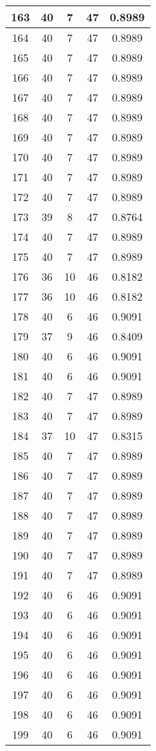 \documentclass[letterpaper, 12pt]{article}
\begin{document}
\begin{longtable}{|c|c|c|c|c|}
\hline
163 & 40 & 7 & 47 & 0.8989 \\
\hline
164 & 40 & 7 & 47 & 0.8989 \\
\hline
165 & 40 & 7 & 47 & 0.8989 \\
\hline
166 & 40 & 7 & 47 & 0.8989 \\
\hline
167 & 40 & 7 & 47 & 0.8989 \\
\hline
168 & 40 & 7 & 47 & 0.8989 \\
\hline
169 & 40 & 7 & 47 & 0.8989 \\
\hline
170 & 40 & 7 & 47 & 0.8989 \\
\hline
171 & 40 & 7 & 47 & 0.8989 \\
\hline
172 & 40 & 7 & 47 & 0.8989 \\
\hline
173 & 39 & 8 & 47 & 0.8764 \\
\hline
174 & 40 & 7 & 47 & 0.8989 \\
\hline
175 & 40 & 7 & 47 & 0.8989 \\
\hline
176 & 36 & 10 & 46 & 0.8182 \\
\hline
177 & 36 & 10 & 46 & 0.8182 \\
\hline
178 & 40 & 6 & 46 & 0.9091 \\
\hline
179 & 37 & 9 & 46 & 0.8409 \\
\hline
180 & 40 & 6 & 46 & 0.9091 \\
\hline
181 & 40 & 6 & 46 & 0.9091 \\
\hline
182 & 40 & 7 & 47 & 0.8989 \\
\hline
183 & 40 & 7 & 47 & 0.8989 \\
\hline
184 & 37 & 10 & 47 & 0.8315 \\
\hline
185 & 40 & 7 & 47 & 0.8989 \\
\hline
186 & 40 & 7 & 47 & 0.8989 \\
\hline
187 & 40 & 7 & 47 & 0.8989 \\
\hline
188 & 40 & 7 & 47 & 0.8989 \\
\hline
189 & 40 & 7 & 47 & 0.8989 \\
\hline
190 & 40 & 7 & 47 & 0.8989 \\
\hline
191 & 40 & 7 & 47 & 0.8989 \\
\hline
192 & 40 & 6 & 46 & 0.9091 \\
\hline
193 & 40 & 6 & 46 & 0.9091 \\
\hline
194 & 40 & 6 & 46 & 0.9091 \\
\hline
195 & 40 & 6 & 46 & 0.9091 \\
\hline
196 & 40 & 6 & 46 & 0.9091 \\
\hline
197 & 40 & 6 & 46 & 0.9091 \\
\hline
198 & 40 & 6 & 46 & 0.9091 \\
\hline
199 & 40 & 6 & 46 & 0.9091 \\
\hline
\end{longtable}
\end{document}
